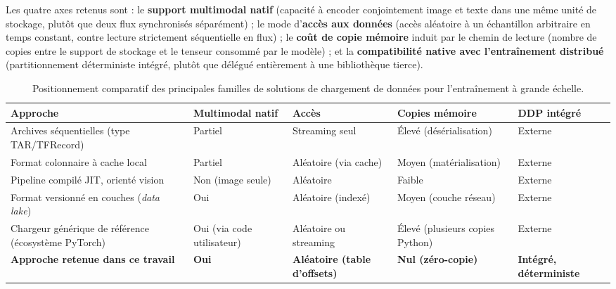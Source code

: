 \documentclass[12pt,a4paper]{report}
\begin{document}
Les quatre axes retenus sont : le \textbf{support multimodal natif} (capacité à encoder conjointement image et texte dans une même unité de stockage, plutôt que deux flux synchronisés séparément) ; le mode d'\textbf{accès aux données} (accès aléatoire à un échantillon arbitraire en temps constant, contre lecture strictement séquentielle en flux) ; le \textbf{coût de copie mémoire} induit par le chemin de lecture (nombre de copies entre le support de stockage et le tenseur consommé par le modèle) ; et la \textbf{compatibilité native avec l'entraînement distribué} (partitionnement déterministe intégré, plutôt que délégué entièrement à une bibliothèque tierce).

\begin{table}[htbp]
  \centering
  \renewcommand{\arraystretch}{1.5} %
  \begin{tabular}{|p{4.5cm}|p{2.6cm}|p{2.8cm}|p{3.4cm}|p{2.2cm}|}
    \hline
    \textbf{Approche} & \textbf{Multimodal natif} & \textbf{Accès} & \textbf{Copies mémoire} & \textbf{DDP intégré} \\
    \hline
    Archives séquentielles (type TAR/TFRecord) & Partiel & Streaming seul & Élevé (désérialisation) & Externe \\
    \hline
    Format colonnaire à cache local & Partiel & Aléatoire (via cache) & Moyen (matérialisation) & Externe \\
    \hline
    Pipeline compilé JIT, orienté vision & Non (image seule) & Aléatoire & Faible & Externe \\
    \hline
    Format versionné en couches (\textit{data lake}) & Oui & Aléatoire (indexé) & Moyen (couche réseau) & Externe \\
    \hline
    Chargeur générique de référence (écosystème PyTorch) & Oui (via code utilisateur) & Aléatoire ou streaming & Élevé (plusieurs copies Python) & Externe \\
    \hline
    \textbf{Approche retenue dans ce travail} & \textbf{Oui} & \textbf{Aléatoire (table d'offsets)} & \textbf{Nul (zéro-copie)} & \textbf{Intégré, déterministe} \\
    \hline
  \end{tabular}
  \vspace{0.2cm}
  \caption{Positionnement comparatif des principales familles de solutions de chargement de données pour l'entraînement à grande échelle.}
  \label{tab:etat_art}
\end{table}
\end{document}
